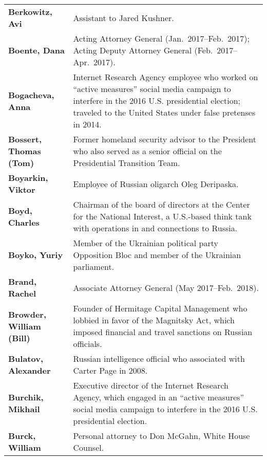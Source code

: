\begin{longtable}{ p{} p{} }
    \textbf{Berkowitz, Avi} & Assistant to Jared Kushner. \\

    \textbf{Boente, Dana} & Acting Attorney General (Jan.~2017--Feb.~2017); Acting Deputy Attorney General (Feb.~2017--Apr.~2017). \\

    \textbf{Bogacheva, Anna} & Internet Research Agency employee who worked on ``active measures'' social media campaign to interfere in the 2016 U.S. presidential election; traveled to the United States under false pretenses in 2014. \\

    \textbf{Bossert, Thomas (Tom)} & Former homeland security advisor to the President who also served as a senior official on the Presidential Transition Team. \\

    \textbf{Boyarkin, Viktor} & Employee of Russian oligarch Oleg Deripaska. \\

    \textbf{Boyd, Charles} & Chairman of the board of directors at the Center for the National Interest, a U.S.-based think tank with operations in and connections to Russia. \\

    \textbf{Boyko, Yuriy} & Member of the Ukrainian political party Opposition Bloc and member of the Ukrainian parliament. \\

    \textbf{Brand, Rachel} & Associate Attorney General (May 2017--Feb.~2018). \\

    \textbf{Browder, William (Bill)} & Founder of Hermitage Capital Management who lobbied in favor of the Magnitsky Act, which imposed financial and travel sanctions on Russian officials. \\

    \textbf{Bulatov, Alexander} & Russian intelligence official who associated with Carter Page in 2008. \\

    \textbf{Burchik, Mikhail} & Executive director of the Internet Research Agency, which engaged in an ``active measures'' social media campaign to interfere in the 2016 U.S. presidential election. \\

    \textbf{Burck, William} & Personal attorney to Don McGahn, White House Counsel. \\


\end{longtable}
